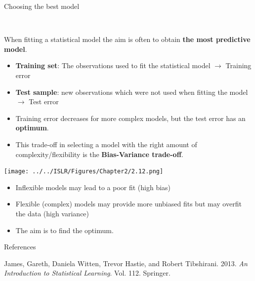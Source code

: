 \documentclass[ignorenonframetext,]{beamer}
\providecommand{\tightlist}{%
  \setlength{\itemsep}{0pt}\setlength{\parskip}{0pt}}
\begin{document}
\begin{frame}

\begin{block}{Choosing the best model}

\(~\)

When fitting a statistical model the aim is often to obtain \textbf{the
most predictive model}.

\begin{itemize}
\item
  \textbf{Training set}: The observations used to fit the statistical
  model \(\rightarrow\) Training error
\item
  \textbf{Test sample}: new observations which were not used when
  fitting the model \(\rightarrow\) Test error
\item
  Training error decreases for more complex models, but the test error
  has an \textbf{optimum}.
\item
  This trade-off in selecting a model with the right amount of
  complexity/flexibility is the \textbf{Bias-Variance trade-off}.
\end{itemize}

\end{block}

\end{frame}

\begin{frame}

\texttt{[image: ../../ISLR/Figures/Chapter2/2.12.png]}

\begin{itemize}
\tightlist
\item
  Inflexible models may lead to a poor fit (high bias)
\item
  Flexible (complex) models may provide more unbiased fits but may
  overfit the data (high variance)
\item
  The aim is to find the optimum.
\end{itemize}

\end{frame}

\begin{frame}{References}

\hypertarget{refs}{}
\hypertarget{ref-ISL}{}
James, Gareth, Daniela Witten, Trevor Hastie, and Robert Tibshirani.
2013. \emph{An Introduction to Statistical Learning}. Vol. 112.
Springer.

\end{frame}
\end{document}
